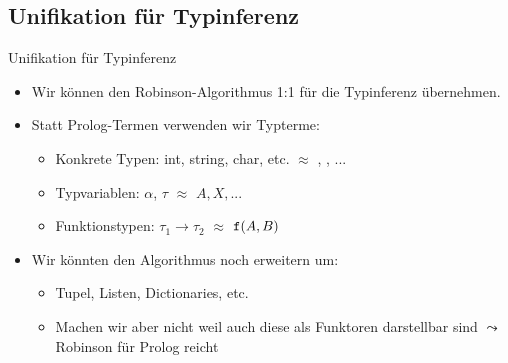 \documentclass{beamer}
\begin{document}
\subsection{Unifikation für Typinferenz}

{

}

\begin{frame}{Unifikation für Typinferenz}
  \begin{itemize}
    \item Wir können den Robinson-Algorithmus 1:1 für die Typinferenz übernehmen.
    \item Statt Prolog-Termen verwenden wir Typterme:
    \begin{itemize}
      \item Konkrete Typen: int, string, char, etc. $\approx$ , , ...
      \item Typvariablen: $\alpha$, $\tau$ $\approx$ $A, X, ...$
      \item Funktionstypen: $\tau_1 \to \tau_2$ $\approx$ $\texttt{f}(A, B)$
    \end{itemize}
    \item Wir könnten den Algorithmus noch erweitern um:
    \begin{itemize}
      \item Tupel, Listen, Dictionaries, etc.
      \item Machen wir aber nicht weil auch diese als Funktoren darstellbar sind $\leadsto$ Robinson für Prolog reicht
    \end{itemize}
  \end{itemize}
\end{frame}
\end{document}
